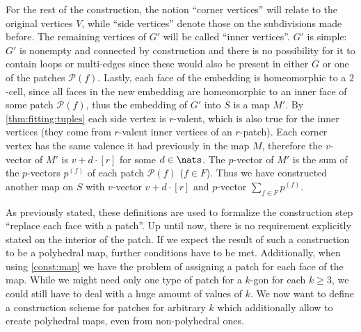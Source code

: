 \begin{construction}
\begin{cdescription}
For the rest of the construction, the notion ``corner vertices'' will relate to the original vertices $V$, while ``side vertices'' denote those on the subdivisions made before. The remaining vertices of $G'$ will be called ``inner vertices''. $G'$ is simple: $G'$ is nonempty and connected by construction and there is no possibility for it to contain loops or multi-edges since these would also be present in either $G$ or one of the patches $\mathcal{P}(f)$. Lastly, each face of the embedding is homeomorphic to a $2$-cell, since all faces in the new embedding are homeomorphic to an inner face of some patch $\mathcal{P}(f)$, thus the embedding of $G'$ into $S$ is a map $M'$. By \autoref{thm:fitting:tuples} each side vertex is $r$-valent, which is also true for the inner vertices (they come from $r$-valent inner vertices of an $r$-patch). Each corner vertex has the same valence it had previously in the map $M$, therefore the $v$-vector of $M'$ is $v + d \cdot [r]$ for some $d \in \nats$. The $p$-vector of $M'$ is the sum of the $p$-vectors $p^{(f)}$ of each patch $\mathcal{P}(f)$ ($f \in F$). Thus we have constructed another map on $S$ with $v$-vector $v + d \cdot [r]$ and $p$-vector $\sum_{f \in F} p^{(f)}$.
  \end{cdescription}
\end{construction}

As previously stated, these definitions are used to formalize the construction step ``replace each face with a patch''. Up until now, there is no requirement explicitly stated on the interior of the patch. If we expect the result of such a construction to be a polyhedral map, further conditions have to be met. Additionally, when using \autoref{const:map} we have the problem of assigning a patch for each face of the map. While we might need only one type of patch for a $k$-gon for each $k \geq 3$, we could still have to deal with a huge amount of values of $k$. We now want to define a construction scheme for patches for arbitrary $k$ which additionally allow to create polyhedral maps, even from non-polyhedral ones.

